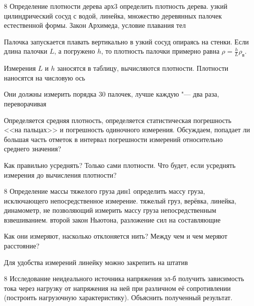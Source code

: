 \begin{enumerate}
	\item \labtitle
		{8}
		{Определение плотности дерева}
		{арх3}
		{определить плотность дерева.}
		{узкий цилиндрический сосуд с водой, линейка, множество деревянных палочек естественной формы.}
		{Закон Архимеда, условие плавания тел}
		{\item Палочка запускается плавать вертикально в узкий сосуд опираясь на стенки. Если длина палочки $L$, а погружено $h$, то плотность палочки примерно равна $\rho=\frac{h}{L}\rho_{\text{в}}$.
		\item Измерения $L$ и $h$ заносятся в таблицу, вычисляются плотности. Плотности наносятся на числовую ось
		\item Они должны измерить порядка 30 палочек, лучше каждую "--- два раза, переворачивая
		\item Определяется средняя плотность, определяется статистическая погрешность <<на пальцах>> и погрешность одиночного измерения. Обсуждаем, попадает ли большая часть отметок в интервал погрешности измерений относительно среднего значения?
		\item Как правильно усреднять? Только сами плотности. Что будет, если усреднять измерения до вычисления плотности?}
	\item \labtitle
		{8}
		{Определение массы тяжелого груза}
		{дин1}
		{определить массу груза, исключающего непосредственное измерение.}
		{тяжелый груз, верёвка, линейка, динамометр, не позволяющий измерить массу груза непосредственным взвешиванием.}
		{второй закон Ньютона, разложение сил на составляющие}
		{\item Как они измеряют, насколько отклоняется нить? Между чем и чем меряют расстояние?
		\item Для удобства измерений линейку можно закрепить на штатив}
	\item \labtitle
		{8}
		{Исследование неидеального источника напряжения}
		{эл-б}
		{получить зависимость тока через нагрузку от напряжения на ней при различном её сопротивлении (построить нагрузочную характеристику). Объяснить полученный результат.}

\end{enumerate}
